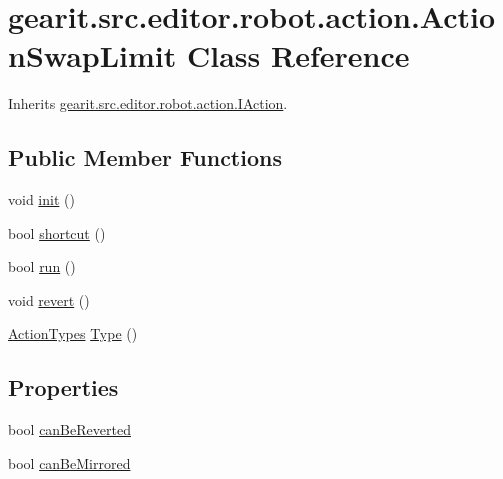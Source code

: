 \hypertarget{classgearit_1_1src_1_1editor_1_1robot_1_1action_1_1_action_swap_limit}{\section{gearit.\+src.\+editor.\+robot.\+action.\+Action\+Swap\+Limit Class Reference}
\label{classgearit_1_1src_1_1editor_1_1robot_1_1action_1_1_action_swap_limit}
}


Inherits \hyperlink{interfacegearit_1_1src_1_1editor_1_1robot_1_1action_1_1_i_action}{gearit.\+src.\+editor.\+robot.\+action.\+I\+Action}.

\subsection*{Public Member Functions}
\begin{DoxyCompactItemize}
\item 
void \hyperlink{classgearit_1_1src_1_1editor_1_1robot_1_1action_1_1_action_swap_limit_a9fb185c99191165ebbd28ebcff24fd6b}{init} ()
\item 
bool \hyperlink{classgearit_1_1src_1_1editor_1_1robot_1_1action_1_1_action_swap_limit_a6ebdf9d2c95d6bb9f7e51b49c63473ae}{shortcut} ()
\item 
bool \hyperlink{classgearit_1_1src_1_1editor_1_1robot_1_1action_1_1_action_swap_limit_a0b4d167dd6795b965bb899d3806056bf}{run} ()
\item 
void \hyperlink{classgearit_1_1src_1_1editor_1_1robot_1_1action_1_1_action_swap_limit_a7f9514e2c37c6a172cffe1af58b4a336}{revert} ()
\item 
\hyperlink{namespacegearit_1_1src_1_1editor_1_1robot_1_1action_a4be0fd46e3952d6135136b20e7b3fc5e}{Action\+Types} \hyperlink{classgearit_1_1src_1_1editor_1_1robot_1_1action_1_1_action_swap_limit_af4c2a754208b193edd9798956847ca0d}{Type} ()
\end{DoxyCompactItemize}
\subsection*{Properties}
\begin{DoxyCompactItemize}
\item 
bool \hyperlink{classgearit_1_1src_1_1editor_1_1robot_1_1action_1_1_action_swap_limit_a5f9b7fb698b8508f8cfff2b0c79544fa}{can\+Be\+Reverted}
\item 
bool \hyperlink{classgearit_1_1src_1_1editor_1_1robot_1_1action_1_1_action_swap_limit_acec40204fea0c848203d5bd91db23633}{can\+Be\+Mirrored}
\end{DoxyCompactItemize}


